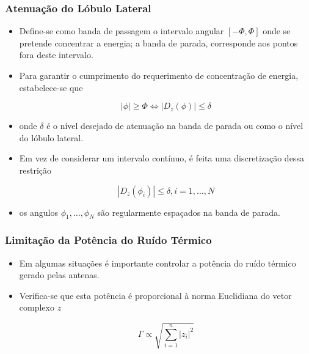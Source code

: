 \begin{frame}
\frametitle{Atenuação do Lóbulo Lateral}
\begin{itemize}

\item Define-se como banda de passagem o intervalo angular $\left[ - \Phi, \Phi \right]$ onde se pretende concentrar a energia; a banda de parada, corresponde aos pontos fora deste intervalo.

\item Para garantir o cumprimento do requerimento de concentração de energia, estabelece-se que

\begin{equation}
|\phi| \geq \Phi \iff |D_{z}\left( \phi \right)| \leq \delta
\end{equation}

\item onde $\delta$ é o n\'ivel desejado de atenuação na banda de parada ou como o n\'ivel do lóbulo lateral.

\item Em vez de considerar um intervalo cont\'inuo, é feita uma discretização dessa restrição

\begin{equation}
|D_{z}\left( \phi_{i} \right)| \leq \delta, i = 1, \ldots, N
\end{equation}

\item os angulos $\phi_{1}, \ldots, \phi_{N}$ s\~ao regularmente espa\c{c}ados na banda de parada.

\end{itemize}
\end{frame}

\begin{frame}
\frametitle{Limitação da Pot\^encia do Ru\'ido Térmico}

\begin{itemize}
\item Em algumas situa\c{c}\~oes é importante controlar a pot\^encia do ru\'ido térmico gerado pelas antenas.

\item Verifica-se que esta pot\^encia é proporcional \`a norma Euclidiana do vetor complexo $z$

\begin{equation}
\Gamma \propto \sqrt{\sum_{i = 1}^{n} |z_{i}|^{2}}
\end{equation}

\end{itemize}

\end{frame}

